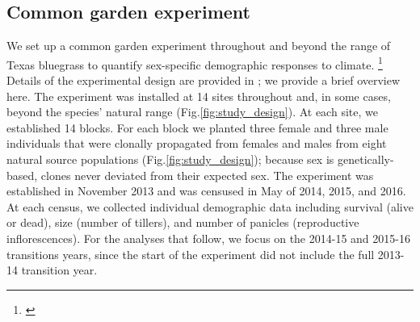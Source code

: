 \documentclass[12pt]{article}
\newcommand{\tom}[2]{{\color{red}{#1}}\footnote{\textit{\color{red}{#2}}}}
\begin{document}
\subsection*{Common garden experiment}
We set up a common garden experiment throughout and beyond the range of Texas bluegrass to quantify sex-specific demographic responses to climate. 
\tom{The novelty of this study lies in the fact that we use a precise climate variable to build a mechanistic model to forecast the response of species to climate change.}{This is not relevant to the description of the experiment.}
Details of the experimental design are provided in \cite{miller2022two}; we provide a brief overview here. 
The experiment was installed at 14 sites throughout and, in some cases, beyond the species' natural range (Fig.\ref{fig:study_design}).
At each site, we established 14 blocks. 
For each block we planted three female and three male individuals that were clonally propagated from females and males from eight natural source populations (Fig.\ref{fig:study_design}); because sex is genetically-based, clones never deviated from their expected sex. 
The experiment was established in November 2013 and was censused in May of 2014, 2015, and 2016. 
At each census, we collected individual demographic data including survival (alive or dead), size (number of tillers), and number of panicles (reproductive inflorescences). 
For the analyses that follow, we focus on the 2014-15 and 2015-16 transitions years, since the start of the experiment did not include the full 2013-14 transition year.
\end{document}
